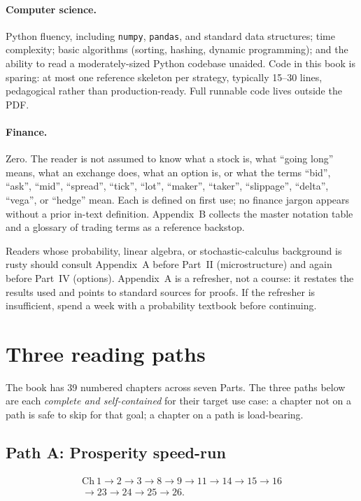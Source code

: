 \paragraph{Computer science.} Python fluency, including \texttt{numpy},
\texttt{pandas}, and standard data structures; time complexity; basic
algorithms (sorting, hashing, dynamic programming); and the ability to
read a moderately-sized Python codebase unaided. Code in this book is
sparing: at most one reference skeleton per strategy, typically
15--30 lines, pedagogical rather than production-ready. Full runnable
code lives outside the PDF.

\paragraph{Finance.} Zero. The reader is not assumed to know what a stock
is, what ``going long'' means, what an exchange does, what an option is,
or what the terms ``bid'', ``ask'', ``mid'', ``spread'', ``tick'',
``lot'', ``maker'', ``taker'', ``slippage'', ``delta'', ``vega'', or
``hedge'' mean. Each is defined on first use; no finance jargon appears
without a prior in-text definition. Appendix~B collects the master
notation table and a glossary of trading terms as a reference backstop.

Readers whose probability, linear algebra, or stochastic-calculus
background is rusty should consult Appendix~A before Part~II
(microstructure) and again before Part~IV (options). Appendix~A is a
refresher, not a course: it restates the results used and points to
standard sources for proofs. If the refresher is insufficient, spend a
week with a probability textbook before continuing.

\section{Three reading paths}
\label{sec:reading_paths}

The book has 39 numbered chapters across seven Parts. The three paths
below are each \emph{complete and self-contained} for their target use
case: a chapter not on a path is safe to skip for that goal; a chapter
on a path is load-bearing.

\subsection*{Path A: Prosperity speed-run}

\[
\begin{gathered}
\text{Ch}\ 1 \to 2 \to 3 \to 8 \to 9 \to 11 \to 14 \to 15 \to 16 \\
\to 23 \to 24 \to 25 \to 26.
\end{gathered}
\]

